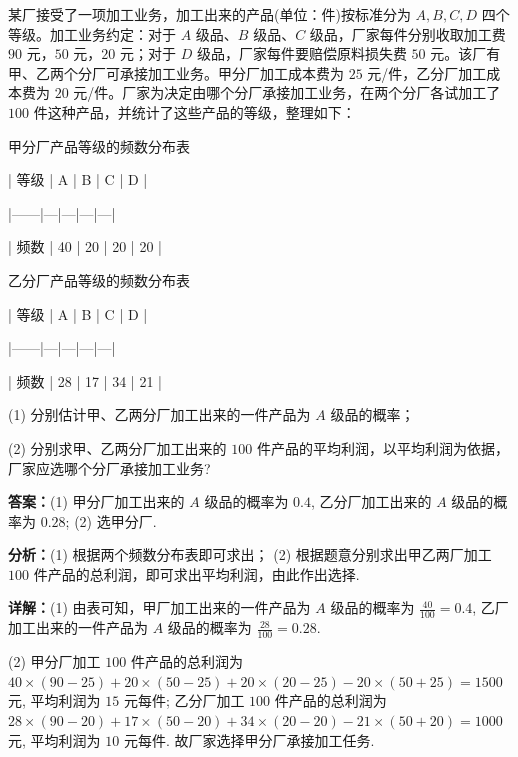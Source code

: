 \begin{question}[points=12]
某厂接受了一项加工业务，加工出来的产品(单位：件)按标准分为 $A, B, C, D$ 四个等级。加工业务约定：对于 $A$ 级品、$B$ 级品、$C$ 级品，厂家每件分别收取加工费 $90$ 元，$50$ 元，$20$ 元；对于 $D$ 级品，厂家每件要赔偿原料损失费 $50$ 元。该厂有甲、乙两个分厂可承接加工业务。甲分厂加工成本费为 $25$ 元/件，乙分厂加工成本费为 $20$ 元/件。厂家为决定由哪个分厂承接加工业务，在两个分厂各试加工了 $100$ 件这种产品，并统计了这些产品的等级，整理如下：



甲分厂产品等级的频数分布表



| 等级 | A | B | C | D |

|------|---|---|---|---|

| 频数 | 40 | 20 | 20 | 20 |



乙分厂产品等级的频数分布表



| 等级 | A | B | C | D |

|------|---|---|---|---|

| 频数 | 28 | 17 | 34 | 21 |



(1) 分别估计甲、乙两分厂加工出来的一件产品为 $A$ 级品的概率；



(2) 分别求甲、乙两分厂加工出来的 $100$ 件产品的平均利润，以平均利润为依据，厂家应选哪个分厂承接加工业务?
\begin{solution}
\textbf{答案：}(1) 甲分厂加工出来的 $A$ 级品的概率为 $0.4$, 乙分厂加工出来的 $A$ 级品的概率为 $0.28$; (2) 选甲分厂.

\textbf{分析：}(1) 根据两个频数分布表即可求出； (2) 根据题意分别求出甲乙两厂加工 $100$ 件产品的总利润，即可求出平均利润，由此作出选择.

\textbf{详解：}(1) 由表可知，甲厂加工出来的一件产品为 $A$ 级品的概率为 $\frac{40}{100}=0.4$, 乙厂加工出来的一件产品为 $A$ 级品的概率为 $\frac{28}{100}=0.28$.

(2) 甲分厂加工 $100$ 件产品的总利润为 $40\times(90-25)+20\times(50-25)+20\times(20-25)-20\times(50+25)=1500$ 元, 平均利润为 $15$ 元每件; 乙分厂加工 $100$ 件产品的总利润为 $28\times(90-20)+17\times(50-20)+34\times(20-20)-21\times(50+20)=1000$ 元, 平均利润为 $10$ 元每件. 故厂家选择甲分厂承接加工任务.
\end{solution}
\end{question}

